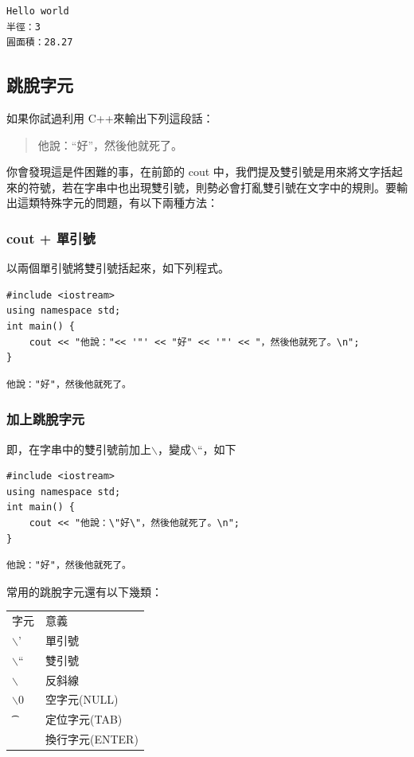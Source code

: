\documentclass[12pt,a4paper]{article}
\begin{document}
\begin{verbatim}
Hello world
半徑：3
圓面積：28.27
\end{verbatim}

\subsection{跳脫字元}
\label{sec:orgf2b3b71}
如果你試過利用 C++來輸出下列這段話：
\begin{verse}
他說：``好''，然後他就死了。\\
\end{verse}
你會發現這是件困難的事，在前節的 cout 中，我們提及雙引號是用來將文字括起來的符號，若在字串中也出現雙引號，則勢必會打亂雙引號在文字中的規則。要輸出這類特殊字元的問題，有以下兩種方法：
\subsubsection{cout + 單引號}
\label{sec:orgfea44a5}
以兩個單引號將雙引號括起來，如下列程式。
\lstset{breaklines=true,language=cpp,label= ,caption= ,captionpos=b,firstnumber=1,numbers=left}
\begin{lstlisting}
#include <iostream>
using namespace std;
int main() {
    cout << "他說："<< '"' << "好" << '"' << "，然後他就死了。\n";
}
\end{lstlisting}

\begin{verbatim}
他說："好"，然後他就死了。
\end{verbatim}
\subsubsection{加上跳脫字元}
\label{sec:orgbbc3c56}
即，在字串中的雙引號前加上$\backslash$，變成$\backslash$``，如下
\lstset{breaklines=true,language=cpp,label= ,caption= ,captionpos=b,firstnumber=1,numbers=left}
\begin{lstlisting}
#include <iostream>
using namespace std;
int main() {
    cout << "他說：\"好\"，然後他就死了。\n";
}
\end{lstlisting}

\begin{verbatim}
他說："好"，然後他就死了。
\end{verbatim}


常用的跳脫字元還有以下幾類：
\begin{center}
\begin{tabular}{ll}
字元 & 意義\\
$\backslash$' & 單引號\\
$\backslash$`` & 雙引號\\
$\backslash$\ & 反斜線\\
$\backslash$0 & 空字元(NULL)\\
\t & 定位字元(TAB)\\
\n & 換行字元(ENTER)\\
\end{tabular}
\end{center}
\end{document}
